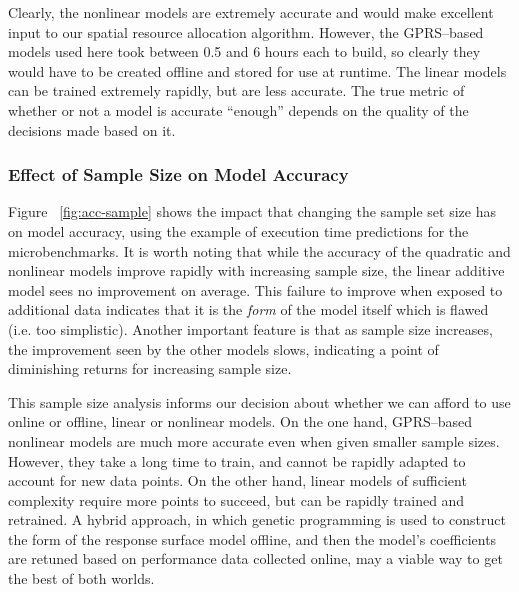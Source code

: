 
Clearly, the nonlinear models are extremely accurate and would make excellent input to our spatial resource allocation algorithm.  However, the GPRS--based models used here took between 0.5 and 6 hours each to build, so clearly they would have to be created offline and stored for use at runtime.  The linear models can be trained extremely rapidly, but are less accurate.  The true metric of whether or not a model is accurate ``enough'' depends on the quality of the decisions made based on it.  

\subsubsection*{Effect of Sample Size on Model Accuracy}
\label{sec:eval:acc-sample}

Figure ~\ref{fig:acc-sample} shows the impact that changing the sample set size has on model accuracy, using the example of execution time predictions for the microbenchmarks.  It is worth noting that while the accuracy of the quadratic and  nonlinear models improve rapidly with increasing sample size, the linear additive model sees no improvement on average.  This failure to improve when exposed to additional data indicates that it is the {\em form} of the model itself which is flawed (i.e. too simplistic).  Another important feature is that as sample size increases, the improvement seen by the other models slows, indicating a point of diminishing returns for increasing sample size.

This sample size analysis informs our decision about whether we can afford to use online or offline, linear or nonlinear models.  On the one hand, GPRS--based nonlinear models are much more accurate even when given smaller sample sizes.  However, they take a long time to train, and cannot be rapidly adapted to account for new data points.  On the other hand, linear models of sufficient complexity require more points to succeed, but can be rapidly trained and retrained.  A hybrid approach, in which genetic programming is used to construct the form of the response surface model offline, and then the model's coefficients are retuned based on performance data collected online, may a viable way to get the best of both worlds.

